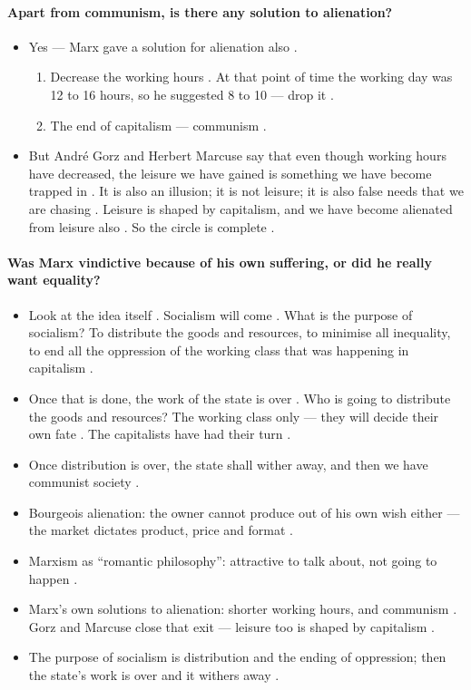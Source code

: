\paragraph{Apart from communism, is there any solution to alienation?}
\begin{itemize}
    \item Yes --- Marx gave a solution for alienation also .
    \begin{enumerate}
        \item Decrease the working hours . At that point of time the working day was 12 to 16 hours, so he suggested 8 to 10 --- drop it .
        \item The end of capitalism --- communism .
    \end{enumerate}
    \item But Andr\'e Gorz and Herbert Marcuse say that even though working hours have decreased, the leisure we have gained is something we have become trapped in . It is also an illusion; it is not leisure; it is also false needs that we are chasing . Leisure is shaped by capitalism, and we have become alienated from leisure also . So the circle is complete .
\end{itemize}

\paragraph{Was Marx vindictive because of his own suffering, or did he really want equality?}
\begin{itemize}
    \item Look at the idea itself . Socialism will come . What is the purpose of socialism? To distribute the goods and resources, to minimise all inequality, to end all the oppression of the working class that was happening in capitalism .
    \item Once that is done, the work of the state is over . Who is going to distribute the goods and resources? The working class only --- they will decide their own fate . The capitalists have had their turn .
    \item Once distribution is over, the state shall wither away, and then we have communist society .
\end{itemize}

\begin{QuickRevision}
\begin{itemize}
    \item Bourgeois alienation: the owner cannot produce out of his own wish either --- the market dictates product, price and format .
    \item Marxism as ``romantic philosophy'': attractive to talk about, not going to happen .
    \item Marx's own solutions to alienation: shorter working hours, and communism . Gorz and Marcuse close that exit --- leisure too is shaped by capitalism .
    \item The purpose of socialism is distribution and the ending of oppression; then the state's work is over and it withers away .
\end{itemize}
\end{QuickRevision}

